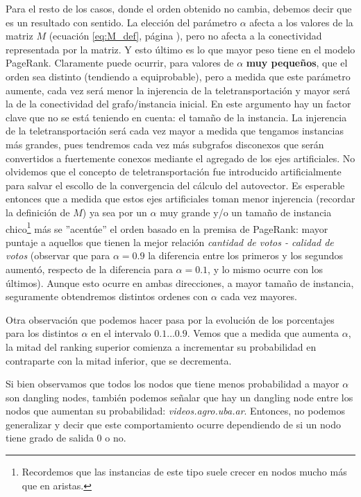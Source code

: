 \par Para el resto de los casos, donde el orden obtenido no cambia, debemos
decir que es un resultado con sentido. La elecci\'on del par\'ametro $\alpha$
afecta a los valores de la matriz $M$ (ecuaci\'on \ref{eq:M_def}, p\'agina
\pageref{eq:M_def}), pero no afecta a la conectividad representada por la
matriz. Y esto \'ultimo es lo que mayor peso tiene en el modelo PageRank.
Claramente puede ocurrir, para valores de $\alpha$ \textbf{muy peque\~nos}, que
el orden sea distinto (tendiendo a equiprobable), pero a medida que este
par\'ametro aumente, cada vez ser\'a menor la injerencia de la
teletransportaci\'on y mayor ser\'a la de la conectividad del grafo/instancia
inicial. En este argumento hay un factor clave que no se est\'a teniendo en
cuenta: el tama\~no de la instancia. La injerencia de la teletransportaci\'on
ser\'a cada vez mayor a medida que tengamos instancias m\'as grandes, pues
tendremos cada vez m\'as subgrafos disconexos que ser\'an convertidos a
fuertemente conexos mediante el agregado de los ejes artificiales. No olvidemos
que el concepto de teletransportaci\'on fue introducido artificialmente para
salvar el escollo de la convergencia del c\'alculo del autovector. Es esperable
entonces que a medida que estos ejes artificiales toman menor injerencia
(recordar la definici\'on de $M$) ya sea por un $\alpha$ muy grande y/o un
tama\~no de instancia chico\footnote{Recordemos que las instancias de este tipo
suele crecer en nodos mucho m\'as que en aristas.} m\'as se ''acent\'ue'' el
orden basado en la premisa de PageRank: mayor puntaje a aquellos que tienen la
mejor relaci\'on \emph{cantidad de votos - calidad de votos} (observar que para
$\alpha=0.9$ la diferencia entre los primeros y los segundos aument\'o, respecto
de la diferencia para $\alpha=0.1$, y lo mismo ocurre con los \'ultimos). Aunque
esto ocurre en ambas direcciones, a mayor tama\~no de instancia, seguramente
obtendremos distintos ordenes con $\alpha$ cada vez mayores.

\par Otra observaci\'on que podemos hacer pasa por la evoluci\'on de los
porcentajes para los distintos $\alpha$ en el intervalo $0.1\dots 0.9$.  Vemos
que a medida que aumenta $\alpha$, la mitad del ranking superior comienza
a incrementar su probabilidad en contraparte con la mitad inferior, que se
decrementa.

\par Si bien observamos que todos los nodos que tiene menos probabilidad a mayor
$\alpha$ son dangling nodes, tambi\'en podemos se\~nalar que hay un dangling
node entre los nodos que aumentan su probabilidad: \emph{videos.agro.uba.ar}.
Entonces, no podemos generalizar y decir que este comportamiento ocurre
dependiendo de si un nodo tiene grado de salida 0 o no.

